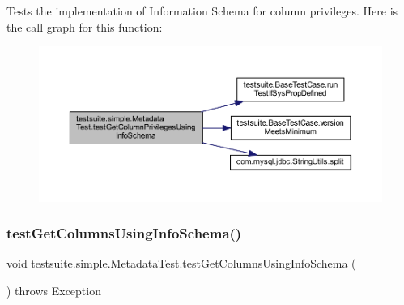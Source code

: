 Tests the implementation of Information Schema for column privileges. Here is the call graph for this function\+:
\nopagebreak
\begin{figure}[H]
\begin{center}
\leavevmode
\includegraphics[width=350pt]{classtestsuite_1_1simple_1_1_metadata_test_a732360d39fdbee06f425012c99944216_cgraph}
\end{center}
\end{figure}
\mbox{\label{classtestsuite_1_1simple_1_1_metadata_test_a96ed59d14490afb4e9e39aa8414acd0a}} 
\subsubsection{\texorpdfstring{test\+Get\+Columns\+Using\+Info\+Schema()}{testGetColumnsUsingInfoSchema()}}
{\footnotesize\ttfamily void testsuite.\+simple.\+Metadata\+Test.\+test\+Get\+Columns\+Using\+Info\+Schema (\begin{DoxyParamCaption}{ }\end{DoxyParamCaption}) throws Exception}

